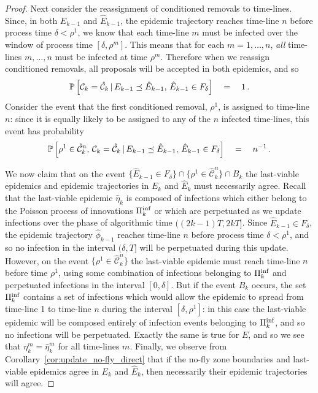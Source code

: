 \documentclass[]{article}
\newcommand{\Conditioned}{\mathcal{C}}
\newcommand{\Epidemic}{E}%
\newcommand{\ple}{\preceq}
\newcommand{\Poisson}{\Pi}
\newcommand{\early}[1]{#1}
\newcommand{\late}[1]{\hat{#1}}
\newcommand{\PoissonInf}{\Poisson^\textup{inf}}
\begin{document}
\begin{proof}
Next consider the reassignment of conditioned removals to time-lines. Since, in both \(\early{\Epidemic}_{k-1}\) and \(\late{\Epidemic}_{k-1}\), the epidemic trajectory reaches time-line \(n\) before process time \(\delta< \rho^1\), we know that each time-line \(m\) must be infected over the window of process time \([\delta,\rho^m]\). This means that for each \(m=1,\dots,n\), \textit{all} time-lines \(m,\dots,n\) must be infected at time \(\rho^m\). Therefore when we reassign conditioned removals, all proposals will be accepted in both epidemics, and so 
\[ 
\Prob{\early\Conditioned_k 
      = \late\Conditioned_k\,|\,\early\Epidemic_{k-1} \ple \late\Epidemic_{k-1},\, \late{\Epidemic}_{k-1}\in F_\delta} 
\quad=\quad 1 \,.
\]
Consider the event that the first conditioned removal, \(\rho^1\), is assigned to time-line \(n\): since it is equally likely to be assigned to any of the \(n\) infected time-lines, this event has probability
\[ 
\Prob{\rho^1 \in \late\Conditioned_k^n,\,
		\early\Conditioned_k = \late\Conditioned_k 
		\,|\,
		\early\Epidemic_{k-1} \ple \late\Epidemic_{k-1},\, \late{\Epidemic}_{k-1}\in F_\delta} 
\quad=\quad n^{-1} \,.
\]

We now claim that on the event \(\{\late{\Epidemic}_{k-1}\in F_\delta\} \cap\{\rho^1\in\late{\Conditioned}_k^n\}\cap B_k\) the last-viable epidemics and epidemic trajectories in \(\early{\Epidemic}_k\) and \(\late{\Epidemic}_k\) must necessarily agree. Recall that the last-viable epidemic \(\late\eta_k\) is composed of infections which either belong to the Poisson process of innovations \(\PoissonInf_k\) or which are perpetuated as we update infections over the phase of algorithmic time \(((2k{-}1)T, 2kT]\). Since \(\late{\Epidemic}_{k-1}\in F_\delta\), the epidemic trajectory \(\late\phi_{k-1}\) reaches time-line \(n\) before process time \(\delta<\rho^1\), and so no infection in the interval \((\delta,T]\) will be perpetuated during this update. However, on the event \(\{\rho^1\in\late{\Conditioned}_k^n\}\) the last-viable epidemic must reach time-line \(n\) before time \(\rho^1\), using some combination of infections belonging to \(\PoissonInf_k\) and perpetuated infections in the interval \([0,\delta]\). But if the event \(B_k\) occurs, the set \(\PoissonInf_k\) contains a set of infections which would allow the epidemic to spread from time-line 1 to time-line \(n\) during the interval \([\delta,\rho^1]\): in this case the last-viable epidemic will be composed entirely of infection events belonging to \(\PoissonInf_k\), and so no infections will be perpetuated. Exactly the same is true for \(\early{\Epidemic}\), and so we see that \(\early\eta_k^m = \late \eta_k^m\) for all time-lines $m$. Finally, we observe from Corollary~\ref{cor:update_no-fly_direct} that if the no-fly zone boundaries and last-viable epidemics agree in \(\early{\Epidemic}_k\) and \(\late{\Epidemic}_k\), then necessarily their epidemic trajectories will agree.


\end{proof}
\end{document}
